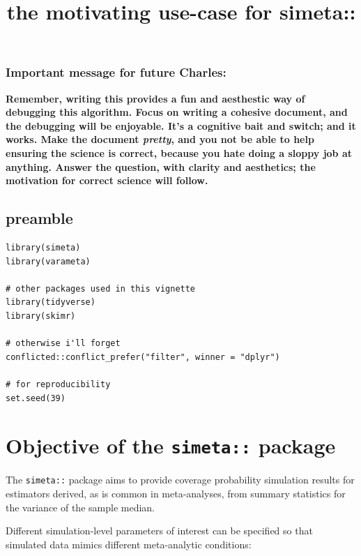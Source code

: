 \documentclass[
]{article}
\title{the motivating use-case for simeta::}
\author{}
\date{\vspace{-2.5em}}
\begin{document}
\maketitle

{
\setcounter{tocdepth}{2}
\tableofcontents
}
\hypertarget{important-message-for-future-charles}{%
\subsubsection{Important message for future
Charles:}\label{important-message-for-future-charles}}

\textbf{Remember, writing this provides a fun and aesthestic way of
debugging this algorithm. Focus on writing a cohesive document, and the
debugging will be enjoyable. It's a cognitive bait and switch; and it
works. Make the document \emph{pretty}, and you not be able to help
ensuring the science is correct, because you hate doing a sloppy job at
anything. Answer the question, with clarity and aesthetics; the
motivation for correct science will follow.}

\hypertarget{preamble}{%
\subsection{preamble}\label{preamble}}

\begin{verbatim}
library(simeta)
library(varameta)

# other packages used in this vignette
library(tidyverse)
library(skimr)

# otherwise i'll forget
conflicted::conflict_prefer("filter", winner = "dplyr")

# for reproducibility
set.seed(39)
\end{verbatim}

\hypertarget{objective-of-the-simeta-package}{%
\section{\texorpdfstring{Objective of the \texttt{simeta::}
package}{Objective of the simeta:: package}}\label{objective-of-the-simeta-package}}

The \texttt{simeta::} package aims to provide coverage probability
simulation results for estimators derived, as is common in
meta-analyses, from summary statistics for the variance of the sample
median.

Different simulation-level parameters of interest can be specified so
that simulated data mimics different meta-analytic conditions:
\end{document}
